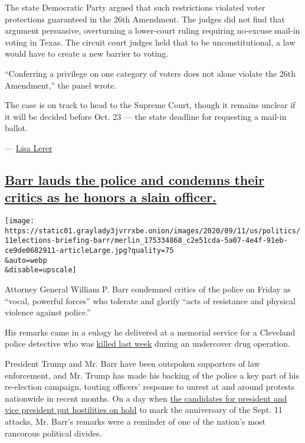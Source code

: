 The state Democratic Party argued that such restrictions violated voter
protections guaranteed in the 26th Amendment. The judges did not find
that argument persuasive, overturning a lower-court ruling requiring
no-excuse mail-in voting in Texas. The circuit court judges held that to
be unconstitutional, a law would have to create a new barrier to voting.

``Conferring a privilege on one category of voters does not alone
violate the 26th Amendment,'' the panel wrote.

The case is on track to head to the Supreme Court, though it remains
unclear if it will be decided before Oct. 23 --- the state deadline for
requesting a mail-in ballot.

--- \href{https://www.nytimes3xbfgragh.onion/by/lisa-lerer}{Lisa Lerer}

\hypertarget{barr-lauds-the-police-and-condemns-their-critics-as-he-honors-a-slain-officer}{%
\subsection{\texorpdfstring{\protect\hyperlink{barr-lauds-the-police-and-condemns-their-critics-as-he-honors-a-slain-officer}{Barr
lauds the police and condemns their critics as he honors a slain
officer.}}{Barr lauds the police and condemns their critics as he honors a slain officer.}}\label{barr-lauds-the-police-and-condemns-their-critics-as-he-honors-a-slain-officer}}

\texttt{[image: https://static01.graylady3jvrrxbe.onion/images/2020/09/11/us/politics/11elections-briefing-barr/merlin\_175334868\_c2e51cda-5a07-4e4f-91eb-ce9de0682911-articleLarge.jpg?quality=75\\\&auto=webp\\\&disable=upscale]}

Attorney General William P. Barr condemned critics of the police on
Friday as ``vocal, powerful forces'' who tolerate and glorify ``acts of
resistance and physical violence against police.''

His remarks came in a eulogy he delivered at a memorial service for a
Cleveland police detective who was
\href{https://www.cleveland.com/metro/2020/09/teen-charged-in-fatal-shooting-of-cleveland-police-officer-informant.html}{killed
last week} during an undercover drug operation.

President Trump and Mr. Barr have been outspoken supporters of law
enforcement, and Mr. Trump has made his backing of the police a key part
of his re-election campaign, touting officers' response to unrest at and
around protests nationwide in recent months. On a day when
\href{https://www.nytimes3xbfgragh.onion/2020/09/11/us/politics/shanksville-trump-biden.html}{the
candidates for president and vice president put hostilities on hold} to
mark the anniversary of the Sept. 11 attacks, Mr. Barr's remarks were a
reminder of one of the nation's most rancorous political divides.

